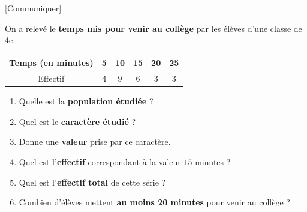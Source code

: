 \documentclass[12pt,a4paper]{article}
\begin{document}

\entetestats


[Communiquer]

On a relevé le \textbf{temps mis pour venir au collège}
par les élèves d'une classe de 4e.

\begin{center}
\renewcommand{\arraystretch}{1.5}
\begin{tabular}{|c|c|c|c|c|c|}
\hline
Temps (en minutes)
& 5 & 10 & 15 & 20 & 25 \\
\hline
Effectif
& 4 & 9 & 6 & 3 & 3 \\
\hline
\end{tabular}
\end{center}

\begin{enumerate}

  \item Quelle est la \textbf{population étudiée} ? 


  \item Quel est le \textbf{caractère étudié} ? 


  \item Donne une \textbf{valeur} prise par ce caractère. 


  \item Quel est l'\textbf{effectif} correspondant à la valeur
  \(15\) minutes ? 


  \item Quel est l'\textbf{effectif total} de cette série ? 


  \item Combien d'élèves mettent \textbf{au moins 20 minutes}
  pour venir au collège ? 


\end{enumerate}
\end{document}
